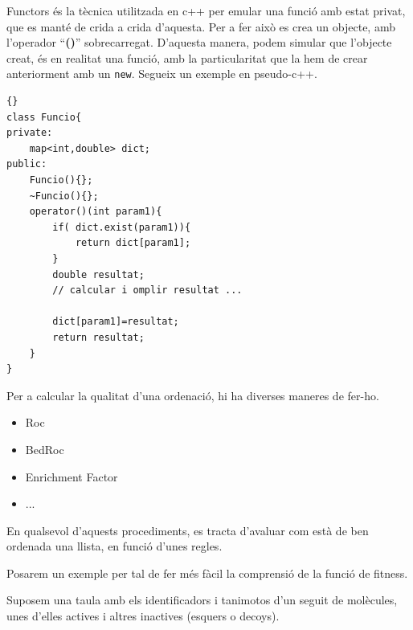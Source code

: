 Functors és la tècnica utilitzada en c++ per emular una funció amb estat privat,
que es manté de crida a crida d'aquesta.  Per a fer això es crea un objecte, amb
l'operador ``\textbf{()}'' sobrecarregat.  D'aquesta manera, podem simular que l'objecte
creat, és en realitat una funció, amb la particularitat que la hem de crear
anteriorment amb un \texttt{new}.  Segueix un exemple en pseudo-c++.


\lstset{language=c++,
	tabsize=2}
\lstset{commentstyle=\textit}

\begin{lstlisting}[frame=trbl]{}
class Funcio{
private:
	map<int,double> dict;
public:
	Funcio(){};
	~Funcio(){};
	operator()(int param1){
		if( dict.exist(param1)){
			return dict[param1];
		}
		double resultat;
		// calcular i omplir resultat ...

		dict[param1]=resultat;
		return resultat;
	}
}
\end{lstlisting}


Per a calcular la qualitat d'una ordenació, hi ha diverses maneres de fer-ho.

\begin{itemize}
	\item Roc
	\item BedRoc
	\item Enrichment Factor
	\item ...
\end{itemize}


En qualsevol d'aquests procediments, es tracta d'avaluar com està de ben ordenada una llista, en funció d'unes regles.

Posarem un exemple per tal de fer més fàcil la comprensió de la funció de
fitness.

Suposem una taula amb els identificadors i tanimotos d'un seguit de molècules,
unes d'elles actives i altres inactives (esquers o decoys).



